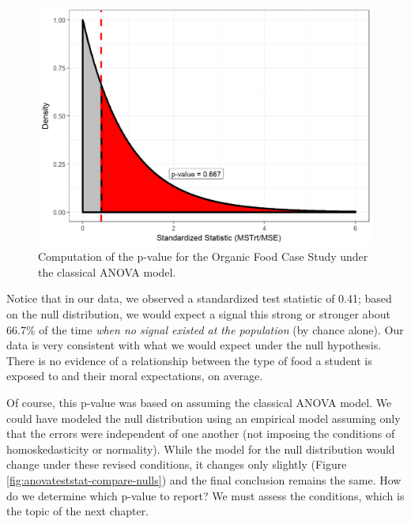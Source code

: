 \documentclass[]{book}
\theoremstyle{plain}
\theoremstyle{mydefn}
\theoremstyle{myexmpl}
\theoremstyle{remark}
\begin{document}
\begin{figure}

{\centering \includegraphics[width=0.8\linewidth]{./Images/anovateststat-pvalue-1} 

}

\caption{Computation of the p-value for the Organic Food Case Study under the classical ANOVA model.}\label{fig:anovateststat-pvalue}
\end{figure}

Notice that in our data, we observed a standardized test statistic of
0.41; based on the null distribution, we would expect a signal this
strong or stronger about 66.7\% of the time \emph{when no signal existed
at the population} (by chance alone). Our data is very consistent with
what we would expect under the null hypothesis. There is no evidence of
a relationship between the type of food a student is exposed to and
their moral expectations, on average.

Of course, this p-value was based on assuming the classical ANOVA model.
We could have modeled the null distribution using an empirical model
assuming only that the errors were independent of one another (not
imposing the conditions of homoskedasticity or normality). While the
model for the null distribution would change under these revised
conditions, it changes only slightly (Figure
\ref{fig:anovateststat-compare-nulls}) and the final conclusion remains
the same. How do we determine which p-value to report? We must assess
the conditions, which is the topic of the next chapter.
\end{document}
